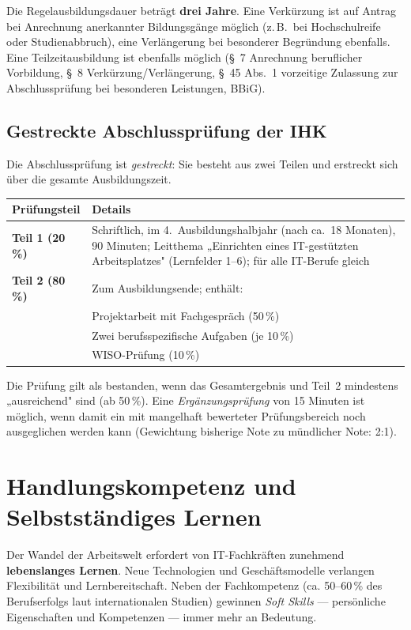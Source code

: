 \documentclass[11pt, a4paper]{article}
\begin{document}
Die Regelausbildungsdauer beträgt \textbf{drei Jahre}. Eine Verkürzung ist auf Antrag bei
Anrechnung anerkannter Bildungsgänge möglich (z.\,B.\ bei Hochschulreife oder
Studienabbruch), eine Verlängerung bei besonderer Begründung ebenfalls. Eine Teilzeitausbildung
ist ebenfalls möglich (§~7 Anrechnung beruflicher Vorbildung, §~8 Verkürzung/Verlängerung, §~45 Abs.~1 vorzeitige Zulassung zur Abschlussprüfung bei besonderen Leistungen, BBiG).

\subsection{Gestreckte Abschlussprüfung der IHK}

Die Abschlussprüfung ist \emph{gestreckt}: Sie besteht aus zwei Teilen und erstreckt sich
über die gesamte Ausbildungszeit.

\begin{center}
\begin{tabular}{p{3.5cm} p{9cm}}
\toprule
\textbf{Prüfungsteil} & \textbf{Details}\\
\midrule
\textbf{Teil 1 (20\,\%)} & Schriftlich, im 4.~Ausbildungshalbjahr (nach ca.\ 18 Monaten), 90 Minuten; Leitthema „Einrichten eines IT-gestützten Arbeitsplatzes" (Lernfelder 1--6); für alle IT-Berufe gleich\\
\textbf{Teil 2 (80\,\%)} & Zum Ausbildungsende; enthält:\\
& \quad Projektarbeit mit Fachgespräch (50\,\%)\\
& \quad Zwei berufsspezifische Aufgaben (je 10\,\%)\\
& \quad WISO-Prüfung (10\,\%)\\
\bottomrule
\end{tabular}
\end{center}

Die Prüfung gilt als bestanden, wenn das Gesamtergebnis und Teil~2 mindestens
„ausreichend" sind (ab 50\,\%). Eine \emph{Ergänzungsprüfung} von 15 Minuten ist möglich,
wenn damit ein mit mangelhaft bewerteter Prüfungsbereich noch ausgeglichen werden kann
(Gewichtung bisherige Note zu mündlicher Note: 2:1).

\section{Handlungskompetenz und Selbstständiges Lernen}

Der Wandel der Arbeitswelt erfordert von IT-Fachkräften zunehmend
\textbf{lebenslanges Lernen}. Neue Technologien und Geschäftsmodelle verlangen
Flexibilität und Lernbereitschaft. Neben der Fachkompetenz (ca. 50--60\,\% des Berufserfolgs
laut internationalen Studien) gewinnen \emph{Soft Skills} --- persönliche Eigenschaften und
Kompetenzen --- immer mehr an Bedeutung.
\end{document}

